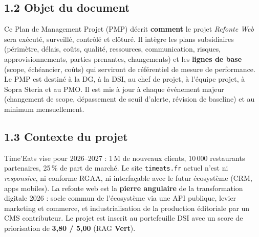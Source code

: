 \documentclass[11pt,a4paper,oneside]{report}
\newcommand{\ragV}{\cellcolor{cnGreen!20}\textbf{\textcolor{cnGreen}{Vert}}}
\begin{document}
\subsection*{1.2 Objet du document}
Ce Plan de Management Projet (PMP) décrit \textbf{comment} le projet \emph{Refonte Web} sera exécuté, surveillé, contrôlé et clôturé. Il intègre les plans subsidiaires (périmètre, délais, coûts, qualité, ressources, communication, risques, approvisionnements, parties prenantes, changements) et les \textbf{lignes de base} (scope, échéancier, coûts) qui serviront de référentiel de mesure de performance. Le PMP est destiné à la DG, à la DSI, au chef de projet, à l'équipe projet, à Sopra Steria et au PMO. Il est mis à jour à chaque événement majeur (changement de scope, dépassement de seuil d'alerte, révision de baseline) et au minimum mensuellement.

\subsection*{1.3 Contexte du projet}
Time'Eats vise pour 2026--2027 : 1\,M de nouveaux clients, 10\,000 restaurants partenaires, 25\,\% de part de marché. Le site \texttt{timeats.fr} actuel n'est ni \emph{responsive}, ni conforme RGAA, ni interfaçable avec le futur écosystème (CRM, apps mobiles). La refonte web est la \textbf{pierre angulaire} de la transformation digitale 2026 : socle commun de l'écosystème via une API publique, levier marketing et commerce, et industrialisation de la production éditoriale par un CMS contributeur. Le projet est inscrit au portefeuille DSI avec un score de priorisation de \textbf{3{,}80 / 5{,}00} (RAG \ragV).
\end{document}
